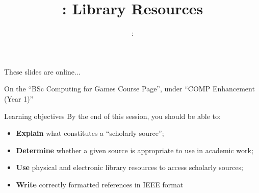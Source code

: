 \usepackage{../../beamerthemeFalmouthGamesAcademy}
\usepackage{multimedia}
\graphicspath{ {../../} }

\lstset{language=Python
}

\usepackage[normalem]{ulem}
\usepackage{wasysym}

\usepackage{pdfpages}

\usetikzlibrary{arrows,automata}




\title{\sessionnumber: Library Resources}
\subtitle{\modulecode: \moduletitle}

\frame{\titlepage} 

\begin{frame}{These slides are online...}
	\begin{center}
		On the ``BSc Computing for Games Course Page'', under ``COMP Enhancement (Year 1)''
	\end{center}
\end{frame}

\begin{frame}{Learning objectives}
	By the end of this session, you should be able to:
	\begin{itemize}
		\item \textbf{Explain} what constitutes a ``scholarly source'';
		\item \textbf{Determine} whether a given source is appropriate to use in academic work;
		\item \textbf{Use} physical and electronic library resources to access scholarly sources;
		\item \textbf{Write} correctly formatted references in IEEE format
	\end{itemize}
\end{frame}






